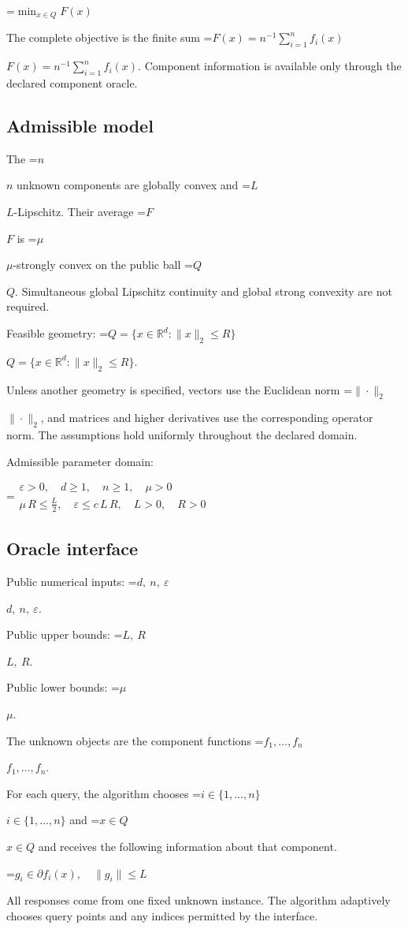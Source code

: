 \documentclass[10pt,a4paper]{article}
\newcommand{\AtlasMath}[1]{\par\begingroup\centering\setbox0=\hbox{$\displaystyle #1$}\ifdim\wd0>1.4\linewidth\typeout{ATLAS WIDE FORMULA: \the\wd0}\fi\ifdim\wd0>\linewidth\resizebox{\linewidth}{!}{\box0}\else\box0\fi\par\endgroup}
\newcommand{\AtlasInlineMath}[1]{\begingroup\setbox0=\hbox{$#1$}\ifdim\wd0>.4\linewidth\endgroup\AtlasMath{#1}\else\endgroup$#1$\fi}
\begin{document}
\AtlasMath{\min_{x\in Q}F(x)}


The complete objective is the finite sum \AtlasInlineMath{F(x)=n^{-1}\sum_{i=1}^n f_i(x)}. Component information is available only through the declared component oracle.

\subsection{Admissible model}
The \AtlasInlineMath{n} unknown components are globally convex and \AtlasInlineMath{L}-Lipschitz. Their average \AtlasInlineMath{F} is \AtlasInlineMath{\mu}-strongly convex on the public ball \AtlasInlineMath{Q}. Simultaneous global Lipschitz continuity and global strong convexity are not required.

Feasible geometry: \AtlasInlineMath{Q=\{x\in\mathbb{R}^d:\|x\|_2\le R\}}.

Unless another geometry is specified, vectors use the Euclidean norm \AtlasInlineMath{\|\cdot\|_2}, and matrices and higher derivatives use the corresponding operator norm. The assumptions hold uniformly throughout the declared domain.

Admissible parameter domain:


\AtlasMath{\begin{gathered}\varepsilon > 0,\quad d \ge 1,\quad n \ge 1,\quad \mu > 0\\\mu\,R \le \frac{L}{2},\quad \varepsilon \le c\,L\,R,\quad L > 0,\quad R > 0\end{gathered}}


\subsection{Oracle interface}
Public numerical inputs: \AtlasInlineMath{d,\ n,\ \varepsilon}.

Public upper bounds: \AtlasInlineMath{L,\ R}.

Public lower bounds: \AtlasInlineMath{\mu}.

The unknown objects are the component functions \AtlasInlineMath{f_1,\ldots,f_n}.

For each query, the algorithm chooses \AtlasInlineMath{i\in\{1,\ldots,n\}} and \AtlasInlineMath{x\in Q} and receives the following information about that component.


\AtlasMath{g_i\in\partial f_i(x),\quad\|g_i\|\le L}


All responses come from one fixed unknown instance. The algorithm adaptively chooses query points and any indices permitted by the interface.
\end{document}
